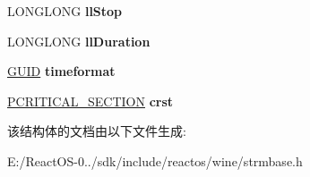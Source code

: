 \begin{DoxyCompactItemize}
L\+O\+N\+G\+L\+O\+NG {\bfseries ll\+Stop}
\item 
\mbox{\label{struct_source_seeking_a64f8d1ec6fe7ccf4eaea0126728c4b21}} 
L\+O\+N\+G\+L\+O\+NG {\bfseries ll\+Duration}
\item 
\mbox{\label{struct_source_seeking_ae455b90cd6da2267ba49f63946a14b25}} 
\hyperlink{interface_g_u_i_d}{G\+U\+ID} {\bfseries timeformat}
\item 
\mbox{\label{struct_source_seeking_a3ee9399b9dd77bd962b8cb2070d8d0de}} 
\hyperlink{struct___c_r_i_t_i_c_a_l___s_e_c_t_i_o_n}{P\+C\+R\+I\+T\+I\+C\+A\+L\+\_\+\+S\+E\+C\+T\+I\+ON} {\bfseries crst}
\end{DoxyCompactItemize}


该结构体的文档由以下文件生成\+:\begin{DoxyCompactItemize}
\item 
E\+:/\+React\+O\+S-\/0../sdk/include/reactos/wine/strmbase.\+h\end{DoxyCompactItemize}

